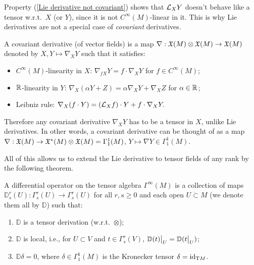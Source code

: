 \begin{rem}\label{rem: Lie derivatives not covariant}
    Property (\ref{Lie derivative not covariant}) shows that $\mathcal{L}_X Y$ doesn't behave like a tensor w.r.t.\ $X$ (or $Y$), since it is not $C^\infty(M)$-linear in it. This is why Lie derivatives are not a special case of \emph{covariant} derivatives.
    
    A covariant derivative (of vector fields) is a map $\nabla:\mathfrak{X}(M)\otimes\mathfrak{X}(M)\to \mathfrak{X}(M)$ denoted by $X,Y\mapsto \nabla_X Y$ such that it satisfies:
    \begin{itemize}
        \item $C^\infty(M)$-linearity in $X$: $\nabla_{fX}Y=f\cdot \nabla_X Y$ for $f\in C^\infty(M)$;
        \item $\mathbb{R} $-linearity in $Y$: $\nabla_X (\alpha Y+Z)=\alpha \nabla_XY+\nabla_XZ$ for $\alpha\in\mathbb{R} $;
        \item Leibniz rule: $\nabla_X(f\cdot Y)=(\mathcal{L}_X f)\cdot Y+f\cdot \nabla_X Y.$
    \end{itemize}
    Therefore any covariant derivative $\nabla_X Y$ has to be a tensor in $X$, unlike Lie derivatives. In other words, a covariant derivative can be thought of as a map $\nabla:\mathfrak{X}(M)\to \mathfrak{X}^\ast(M)\otimes\mathfrak{X}(M)=\Gamma^1_1(M)$, $Y\mapsto \nabla Y\in\Gamma^1_1(M)$.
\end{rem}

All of this allows us to extend the Lie derivative to tensor fields of any rank by the following theorem.

\begin{defn}
    A differential operator on the tensor algebra $\Gamma^\infty(M)$ is a collection of maps $\mathbb{D}^r_s(U):\Gamma^r_s(U)\to \Gamma^r_s(U)$ for all $r,s\geq 0$ and each open $U\mathring{\subset}M$ (we denote them all by $\mathbb{D}$) such that:
\begin{enumerate}
    \item $\mathbb{D}$ is a tensor derivation (w.r.t.\ $\otimes$);
    \item $\mathbb{D}$ is local, i.e., for $U\subset V$ and $t\in\Gamma^r_s(V)$, $\restr{\mathbb{D}(t)}{U}=\mathbb{D}(\restr{t}{U})$;
    \item $\mathbb{D} \delta=0$, where $\delta\in\Gamma^1_1(M)$ is the Kronecker tensor $\delta=\operatorname{id}_{\mathrm{T} M}$.
\end{enumerate}
\end{defn}

